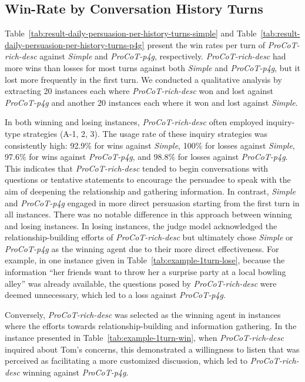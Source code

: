 \documentclass[11pt]{article}
\begin{document}
\subsection{Win-Rate by Conversation History Turns}
Table~\ref{tab:result-daily-persuasion-per-history-turns-simple} and Table~\ref{tab:result-daily-persuasion-per-history-turns-p4g} present the win rates per turn of \textit{ProCoT-rich-desc} against \textit{Simple} and \textit{ProCoT-p4g}, respectively. 
\textit{ProCoT-rich-desc} had more wins than losses for most turns against both \textit{Simple} and \textit{ProCoT-p4g}, but it lost more frequently in the first turn. 
We conducted a qualitative analysis by extracting 20 instances each where \textit{ProCoT-rich-desc} won and lost against \textit{ProCoT-p4g} and another 20 instances each where it won and lost against \textit{Simple}.

In both winning and losing instances, \textit{ProCoT-rich-desc} often employed inquiry-type strategies (A-1, 2, 3). 
The usage rate of these inquiry strategies was consistently high: 92.9\% for wins against \textit{Simple}, 100\% for losses against \textit{Simple}, 97.6\% for wins against \textit{ProCoT-p4g}, and 98.8\% for losses against \textit{ProCoT-p4g}. 
This indicates that \textit{ProCoT-rich-desc} tended to begin conversations with questions or tentative statements to encourage the persuadee to speak with the aim of deepening the relationship and gathering information.
In contrast, \textit{Simple} and \textit{ProCoT-p4g} engaged in more direct persuasion starting from the first turn in all instances. 
There was no notable difference in this approach between winning and losing instances. 
In losing instances, the judge model acknowledged the relationship-building efforts of \textit{ProCoT-rich-desc} but ultimately chose \textit{Simple} or \textit{ProCoT-p4g} as the winning agent due to their more direct effectiveness. 
For example, in one instance given in Table~\ref{tab:example-1turn-lose}, because the information ``her friends want to throw her a surprise party at a local bowling alley'' was already available, the questions posed by \textit{ProCoT-rich-desc} were deemed unnecessary, which led to a loss against \textit{ProCoT-p4g}.

Conversely, \textit{ProCoT-rich-desc} was selected as the winning agent in instances where the efforts towards relationship-building and information gathering.
In the instance presented in Table~\ref{tab:example-1turn-win}, when \textit{ProCoT-rich-desc} inquired about Tom's concerns, this demonstrated a willingness to listen that was perceived as facilitating a more customized discussion, which led to \textit{ProCoT-rich-desc} winning against \textit{ProCoT-p4g}.
\end{document}
